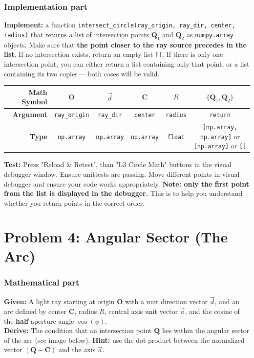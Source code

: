 \documentclass[11pt]{article}
\begin{document}
\subsubsection*{Implementation part}\textbf{Implement:} a function \lstinline|intersect_circle(ray_origin, ray_dir, center, radius)| that returns a list of intersection points $\mathbf{Q}_1$ and $\mathbf{Q}_2$ as \lstinline|numpy.array| objects. Make sure that \textbf{the point closer to the ray source precedes in the list}. If no intersection exists, return an empty list \lstinline|[]|. If there is only one intersection point, you can either return a list containing only that point, or a list containing its two copies\,--- both cases will be valid.
\begin{center}
\renewcommand{\arraystretch}{2.0}
\begin{tabular}{r | c | c | c | c | c}
\toprule
\textbf{Math Symbol} & $\mathbf{O}$ & $\vec{d}$ & $\mathbf{C}$ & $R$ & $\{\mathbf{Q}_1, \mathbf{Q}_2\}$ \\
\midrule\textbf{Argument} & \lstinline|ray_origin| & \lstinline|ray_dir| & \lstinline|center| & \lstinline|radius| & \lstinline|return| \\
\midrule
\textbf{Type} & \lstinline|np.array| & \lstinline|np.array| & \lstinline|np.array| & \lstinline|float| & \parbox{5cm}{\lstinline|[np.array, np.array]| or\\ \lstinline|[np.array]| or \lstinline|[]|} \\
\bottomrule
\end{tabular}
\end{center}
\textbf{Test:} Press "Reload \& Retest", than "L3 Circle Math" buttons in the visual debugger window. Ensure unittests are passing. Move different points in visual debugger and ensure your code works appropriately. \textbf{Note: only the first point from the list is displayed in the debugger.} This is to help you understand whether you return points in the correct order.


\section*{Problem 4: Angular Sector (The Arc)}

\subsubsection*{Mathematical part}
\textbf{Given:} A light ray starting at origin $\mathbf{O}$ with a unit direction vector $\vec{d}$, and an arc defined by center $\mathbf{C}$, radius $R$, central axis unit vector $\vec{a}$, and the cosine of the \textbf{half}-aperture angle $\cos(\phi)$. \\
\textbf{Derive:} The condition that an intersection point $\mathbf{Q}$ lies within the angular sector of the arc (see image below). \textbf{Hint:} use the dot product between the normalized vector $(\mathbf{Q} - \mathbf{C})$ and the axis $\vec{a}$.
\end{document}
